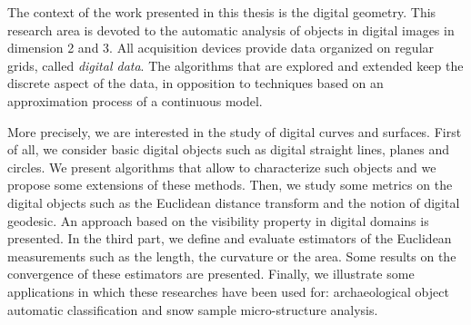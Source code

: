 The context  of  the  work presented  in  this  thesis is the  digital
geometry.  This research area is devoted  to the automatic analysis of
objects in  digital images  in  dimension  2 and 3.    All acquisition
devices  provide data organized  on regular grids, called {\it digital
data}.   The  algorithms  that  are  explored  and  extended keep  the
discrete aspect of  the data, in opposition to  techniques based on an
approximation process of a continuous model.

More precisely, we  are interested in the  study of digital curves and
surfaces.  First of all,  we  consider basic  digital objects such  as
digital  straight lines, planes  and  circles.  We present  algorithms
that allow to characterize such objects and we propose some extensions
of these methods.  Then, we study some metrics  on the digital objects
such  as the Euclidean  distance transform  and  the notion of digital
geodesic.   An approach based   on the visibility property  in digital
domains is presented.    In the third  part,  we define and   evaluate
estimators of the Euclidean measurements such as the length, the curvature
or the area.  Some results on the  convergence of these estimators are
presented.  Finally, we illustrate some applications in which
these  researches have been  used for: archaeological object automatic
classification and snow sample micro-structure analysis.
